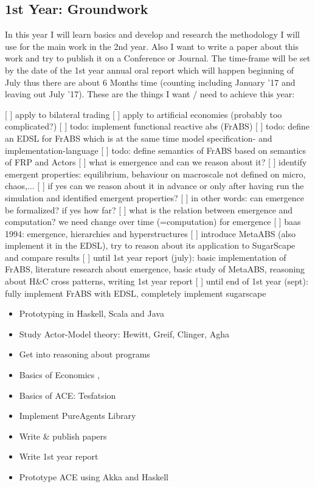 \subsection{1st Year: Groundwork}
In this year I will learn basics and develop and research the methodology I will use for the main work in the 2nd year. Also I want to write a paper about this work and try to publish it on a Conference or Journal. The time-frame will be set by the date of the 1st year annual oral report which will happen beginning of July thus there are about 6 Months time (counting including January '17 and leaving out July '17). These are the things I want / need to achieve this year:

[ ] apply to bilateral trading
[ ] apply to artificial economies (probably too complicated?)
[ ] todo: implement functional reactive abs (FrABS)
[ ] todo: define an EDSL for FrABS which is at the same time model specification- and implementation-language
[ ] todo: define semantics of FrABS based on semantics of FRP and Actors
[ ] what is emergence and can we reason about it? 
[ ] identify emergent properties: equilibrium, behaviour on macroscale not defined on micro, chaos,...
[ ] if yes can we reason about it in advance or only after having run the simulation and identified emergent properties?
[ ] in other words: can emergence be formalized? if yes how far?
[ ] what is the relation between emergence and computation? we need change over time (=computation) for emergence
[ ] baas 1994: emergence, hierarchies and hyperstructures
[ ] introduce MetaABS (also implement it in the EDSL), try to reason about its application to SugarScape and compare results
[ ] until 1st year report (july): basic implementation of FrABS, literature research about emergence, basic study of MetaABS, reasoning about H&C cross patterns, writing 1st year report
[ ] until end of 1st year (sept): fully implement FrABS with EDSL, completely implement sugarscape

\begin{itemize}
\item Prototyping in Haskell, Scala and Java
\item Study Actor-Model theory: Hewitt, Greif, Clinger, Agha
\item Get into reasoning about programs
\item Basics of Economics \cite{bowles_understanding_2005}, \cite{kirman_complex_2010}
\item Basics of ACE: Tesfatsion
\item Implement PureAgents Library
\item Write \& publish papers
\item Write 1st year report
\item Prototype ACE using Akka and Haskell
\end{itemize}

